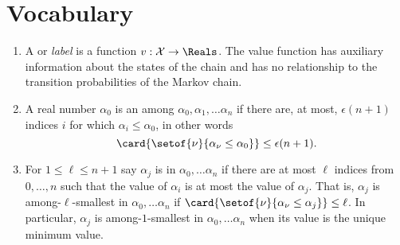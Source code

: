 \documentclass[12pt]{article}
\begin{document}
\section*{Vocabulary}
\begin{enumerate}
    \item
        A  or \emph{label} is a function \( v :
        \mathcal{X} \to \Reals \).  The value function has auxiliary
        information about the states of the chain and has no
        relationship to the transition probabilities of the Markov
        chain.
    \item
        A real number \( \alpha_0 \) is an 
        among \( \alpha_0, \alpha_1, \dots \alpha_n \) if there are, at
        most, \( \epsilon(n + 1) \) indices \( i \) for which \( \alpha_i
        \le \alpha_0 \), in other words
        \[
            \card{ \setof{\nu}{\alpha_{\nu} \le \alpha_0}} \le \epsilon(n+1).
        \]

    \item
        For \( 1 \le \ell \le n+1 \) say \( \alpha_j \) is  in \( \alpha_0, \dots \alpha_n \) if there
        are at most \( \ell \) indices from \( 0, \dots, n \) such that
        the value of \( \alpha_i \) is at most the value of \( \alpha_j \).
        That is, \( \alpha_j \) is among-\( \ell \)-smallest in \(
        \alpha_0, \dots \alpha_n \) if \( \card{ \setof{\nu}{\alpha_\nu
        \le \alpha_j}} \le \ell \).  In particular, \( \alpha_j \) is
        among-\( 1 \)-smallest in \( \alpha_0, \dots \alpha_n \) when
        its value is the unique minimum value.
\end{enumerate}

\hr
\end{document}
